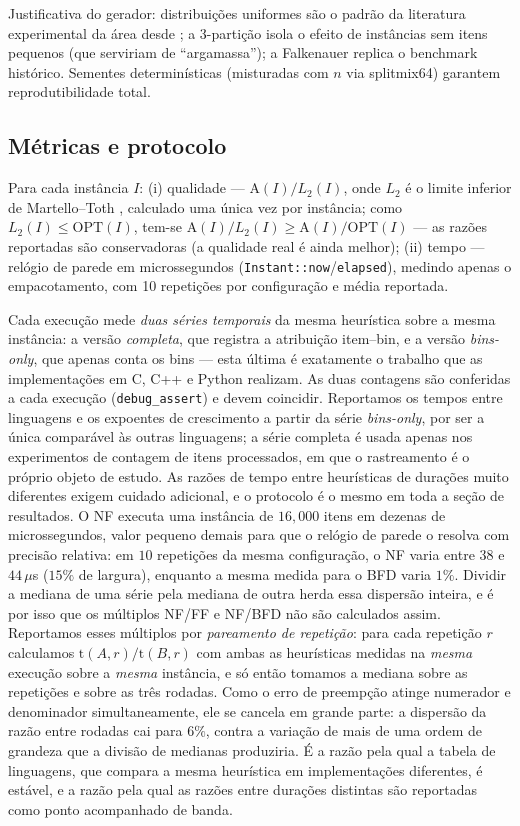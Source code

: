 \documentclass[12pt]{article}
\begin{document}
Justificativa do gerador: distribuições uniformes são o padrão da literatura experimental da área desde \cite{falkenauer1996}; a 3-partição isola o efeito de instâncias sem itens pequenos (que serviriam de ``argamassa''); a Falkenauer replica o benchmark histórico. Sementes determinísticas (misturadas com $n$ via splitmix64) garantem reprodutibilidade total.

\subsection{Métricas e protocolo}

Para cada instância $I$: (i) qualidade --- $\mathrm{A}(I)/L_2(I)$, onde $L_2$ é o limite inferior de Martello--Toth \cite{martello1990}, calculado uma única vez por instância; como $L_2(I) \leq \mathrm{OPT}(I)$, tem-se $\mathrm{A}(I)/L_2(I) \geq \mathrm{A}(I)/\mathrm{OPT}(I)$ --- as razões reportadas são conservadoras (a qualidade real é ainda melhor); (ii) tempo --- relógio de parede em microssegundos (\texttt{Instant::now}/\texttt{elapsed}), medindo apenas o empacotamento, com 10 repetições por configuração e média reportada.

Cada execução mede \emph{duas séries temporais} da mesma heurística sobre a mesma instância: a versão \emph{completa}, que registra a atribuição item--bin, e a versão \emph{bins-only}, que apenas conta os bins --- esta última é exatamente o trabalho que as implementações em C, C++ e Python realizam. As duas contagens são conferidas a cada execução (\texttt{debug\_assert}) e devem coincidir. Reportamos os tempos entre linguagens e os expoentes de crescimento a partir da série \emph{bins-only}, por ser a única comparável às outras linguagens; a série completa é usada apenas nos experimentos de contagem de itens processados, em que o rastreamento é o próprio objeto de estudo.
As razões de tempo entre heurísticas de durações muito diferentes exigem cuidado adicional, e o protocolo é o mesmo em toda a seção de resultados. O NF executa uma instância de $16{,}000$ itens em dezenas de microssegundos, valor pequeno demais para que o relógio de parede o resolva com precisão relativa: em $10$ repetições da mesma configuração, o NF varia entre $38$ e $44\,\mu$s ($15\%$ de largura), enquanto a mesma medida para o BFD varia $1\%$. Dividir a mediana de uma série pela mediana de outra herda essa dispersão inteira, e é por isso que os múltiplos NF/FF e NF/BFD não são calculados assim. Reportamos esses múltiplos por \emph{pareamento de repetição}: para cada repetição $r$ calculamos $\mathrm{t}(A,r)/\mathrm{t}(B,r)$ com ambas as heurísticas medidas na \emph{mesma} execução sobre a \emph{mesma} instância, e só então tomamos a mediana sobre as repetições e sobre as três rodadas. Como o erro de preempção atinge numerador e denominador simultaneamente, ele se cancela em grande parte: a dispersão da razão entre rodadas cai para $6\%$, contra a variação de mais de uma ordem de grandeza que a divisão de medianas produziria. É a razão pela qual a tabela de linguagens, que compara a mesma heurística em implementações diferentes, é estável, e a razão pela qual as razões entre durações distintas são reportadas como ponto acompanhado de banda.\label{sec:pareamento}
\end{document}
